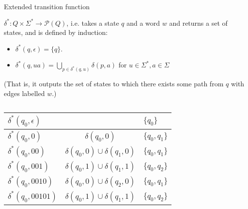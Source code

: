 \documentclass[handout]{beamer}
\begin{document}
\begin{frame}{Extended transition function}

    \begin{definition}
    $\delta^*:Q\times \Sigma^*\rightarrow {\mathcal P}(Q)$, i.e. takes a state $q$ and a word $w$ and returns a set of states, and is defined by induction:
    \begin{itemize}
        \item $\delta^*(q,\epsilon)=\{q\}$.
        \item $\delta^*(q,ua)=\bigcup_{p\in\delta^*(q,u)}\delta(p,a)$ for $u\in\Sigma^*,a\in\Sigma$
    \end{itemize}
    (That is, it outputs the set of states to which there exists some path from $q$ with edges labelled $w$.)
    \end{definition}

    \bigskip
    
    \begin{columns}


        \small

        \begin{tabular}{ l @{=} c @{=}l}
            $\delta^*(q_0,\epsilon)$ &  & $\{q_0\} $\\ \hline
            $\delta^*(q_0,0)$ & $\delta(q_0,0)$ & $\{q_0,q_1\} $\\ \hline
            $\delta^*(q_0,00)$& $\delta(q_0,0)\cup \delta(q_1,0)$ & $\{q_0,q_1\} $\\ \hline
            $\delta^*(q_0,001)$ & $\delta(q_0,1)\cup \delta(q_1,1)$ & $\{q_0,q_2\} $\\ \hline
            $\delta^*(q_0,0010)$ & $\delta(q_0,0)\cup \delta(q_2,0)$ & $\{q_0,q_1\} $\\ 	\hline
            $\delta^*(q_0,00101)$ & $\delta(q_0,1)\cup \delta(q_1,1)$ & $\{q_0,q_2\} $
        \end{tabular}



    \end{columns}

\end{frame}
\end{document}
